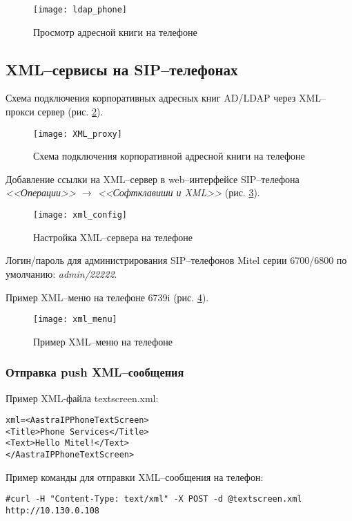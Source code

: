 \begin{figure}[!ht]
  \center
  \texttt{[image: ldap\_phone]}
  \caption{Просмотр адресной книги на телефоне}
  \label{img:ldap_phone}
\end{figure}

\subsection{XML--сервисы на SIP--телефонах}
Схема подключения корпоративных адресных книг AD/LDAP через XML--прокси сервер (рис. \ref{img:xml_proxy}).
\begin{figure}[!ht]
  \center
  \texttt{[image: XML\_proxy]}
  \caption{Схема подключения корпоративной адресной книги на телефоне}
  \label{img:xml_proxy}
\end{figure}
 
Добавление ссылки на XML--сервер в web--интерфейсе SIP--телефона {\em <<Операции>> $\rightarrow$ <<Софтклавиши и XML>>} (рис. \ref{img:xml_config}).
\begin{figure}[!ht]
  \center
  \texttt{[image: xml\_config]}
  \caption{Настройка XML--сервера на телефоне}
  \label{img:xml_config}
\end{figure}

Логин/пароль для администрирования SIP--телефонов Mitel серии 6700/6800 по умолчанию: {\em admin/22222}.

Пример XML--меню на телефоне 6739i (рис. \ref{img:xml_menu}).
\begin{figure}[!ht]
  \center
  \texttt{[image: xml\_menu]}
  \caption{Пример XML--меню на телефоне}
  \label{img:xml_menu}
\end{figure}
 
\subsubsection{Отправка push XML--сообщения}

Пример XML-файла textscreen.xml:
\begin{lstlisting}
xml=<AastraIPPhoneTextScreen>
<Title>Phone Services</Title>
<Text>Hello Mitel!</Text>
</AastraIPPhoneTextScreen>
\end{lstlisting}

Пример команды для отправки XML--сообщения на телефон:
\begin{lstlisting}
#curl -H "Content-Type: text/xml" -X POST -d @textscreen.xml http://10.130.0.108
\end{lstlisting}

